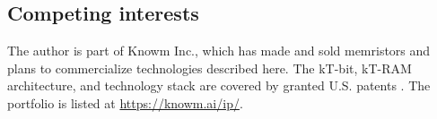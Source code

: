 \documentclass[reprint,amsmath,amssymb,aps,pra,floatfix,nofootinbib]{revtex4-2}
\begin{document}
\subsection*{Competing interests}
The author is part of Knowm Inc., which has made and sold memristors and plans to commercialize technologies described here. The kT-bit, kT-RAM architecture, and technology stack are covered by granted U.S. patents \cite{nugent2015ktbitpatent,nugent2017ktrampatent,nugent2019stackpatent}. The portfolio is listed at \url{https://knowm.ai/ip/}.


\end{document}
